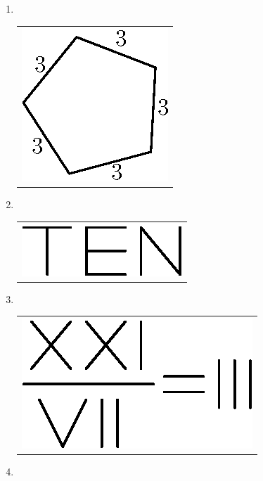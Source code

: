\begin{enumerate}
\bigskip

\item 
~

  \vskip -0.5cm
  
\begin{tabular}[t]{c}
\centering
\includegraphics{src/figures/ans37.eps}
\end{tabular}

\bigskip
\bigskip

\item 
~

  \vskip -0.4cm
  
\begin{tabular}[t]{c}
\centering
\includegraphics{src/figures/ans38.eps}
\end{tabular}

\item 
~

  \vskip -0.4cm
  
\begin{tabular}[t]{c}
\centering
\includegraphics{src/figures/ans39.eps}
\end{tabular}

\bigskip

\item 
~


\end{enumerate}
